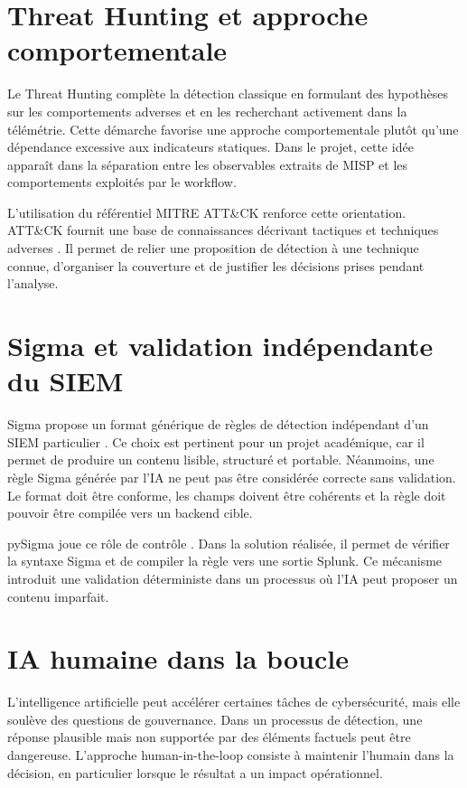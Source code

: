 \section{Threat Hunting et approche comportementale}

Le Threat Hunting complète la détection classique en formulant des hypothèses sur les comportements adverses et en les recherchant activement dans la télémétrie. Cette démarche favorise une approche comportementale plutôt qu'une dépendance excessive aux indicateurs statiques. Dans le projet, cette idée apparaît dans la séparation entre les observables extraits de MISP et les comportements exploités par le workflow.

L'utilisation du référentiel MITRE ATT\&CK renforce cette orientation. ATT\&CK fournit une base de connaissances décrivant tactiques et techniques adverses \cite{mitreattack}. Il permet de relier une proposition de détection à une technique connue, d'organiser la couverture et de justifier les décisions prises pendant l'analyse.

\section{Sigma et validation indépendante du SIEM}

Sigma propose un format générique de règles de détection indépendant d'un SIEM particulier \cite{sigmahq}. Ce choix est pertinent pour un projet académique, car il permet de produire un contenu lisible, structuré et portable. Néanmoins, une règle Sigma générée par l'IA ne peut pas être considérée correcte sans validation. Le format doit être conforme, les champs doivent être cohérents et la règle doit pouvoir être compilée vers un backend cible.

pySigma joue ce rôle de contrôle \cite{pysigma}. Dans la solution réalisée, il permet de vérifier la syntaxe Sigma et de compiler la règle vers une sortie Splunk. Ce mécanisme introduit une validation déterministe dans un processus où l'IA peut proposer un contenu imparfait.

\section{IA humaine dans la boucle}

L'intelligence artificielle peut accélérer certaines tâches de cybersécurité, mais elle soulève des questions de gouvernance. Dans un processus de détection, une réponse plausible mais non supportée par des éléments factuels peut être dangereuse. L'approche human-in-the-loop consiste à maintenir l'humain dans la décision, en particulier lorsque le résultat a un impact opérationnel.

